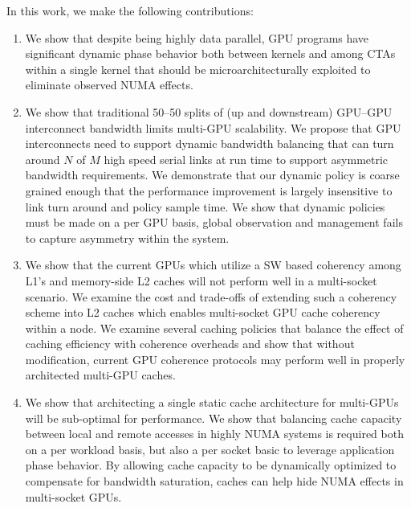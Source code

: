 In this work, we make the following contributions:

\begin{enumerate}
\item
We show that despite being highly data parallel, GPU programs have significant
dynamic phase behavior both between kernels and among CTAs within a single
kernel that should be microarchitecturally exploited to eliminate observed
NUMA effects.

\item
We show that traditional 50--50 splits of (up and 
downstream) GPU--GPU interconnect bandwidth limits multi-GPU scalability.  We propose
that GPU interconnects need to support dynamic bandwidth balancing that can
turn around $N$ of $M$ high speed serial links at run time to support asymmetric
bandwidth requirements.  We demonstrate that our dynamic policy is coarse
grained enough that the performance improvement is largely insensitive to link turn 
around and policy sample time.  We show that dynamic policies must be made on a
per GPU basis, global observation and management fails to capture asymmetry 
within the system.

\item
We show that the current GPUs which utilize a SW based coherency among L1's and 
memory-side L2 caches will not perform well in a multi-socket scenario.  
We examine the cost and trade-offs of extending such a coherency scheme into L2 caches 
which enables multi-socket GPU cache coherency within a node.  We examine several
caching policies that balance the effect of caching efficiency with coherence overheads
and show that without modification, current GPU coherence protocols may perform
well in properly architected multi-GPU caches.

\item
We show that architecting a single static cache architecture for multi-GPUs will
be sub-optimal for performance. We show that balancing cache capacity between
local and remote accesses in highly NUMA systems is required both on a per
workload basis, but also a per socket basic to leverage application phase
behavior.  By allowing cache capacity to be dynamically optimized to compensate for
bandwidth saturation, caches can help hide NUMA effects in multi-socket GPUs.






\end{enumerate}
